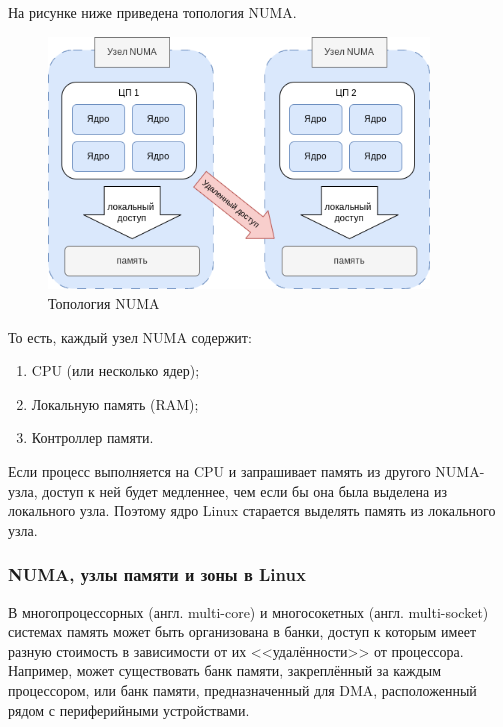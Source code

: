 На рисунке ниже приведена топология NUMA.

\begin{figure}[H]
	\centering
	\includegraphics[width=0.9\textwidth]{img/numa.png}
	\caption{Топология NUMA}
	\label{fig:numa}
\end{figure}

То есть, каждый узел NUMA содержит:
\begin{enumerate}
    \item CPU (или несколько ядер);
    \item Локальную память (RAM);
    \item Контроллер памяти.
\end{enumerate}

Если процесс выполняется на CPU и запрашивает память из другого NUMA-узла, доступ к ней будет медленнее, чем если бы она была выделена из локального узла.
Поэтому ядро Linux старается выделять память из локального узла.


\subsubsection{NUMA, узлы памяти и зоны в Linux}

В многопроцессорных (англ. multi-core) и многосокетных (англ. multi-socket) системах память может быть организована в банки, доступ к которым имеет разную стоимость в зависимости от их <<удалённости>> от процессора.
Например, может существовать банк памяти, закреплённый за каждым процессором, или банк памяти, предназначенный для DMA, расположенный рядом с периферийными устройствами.

